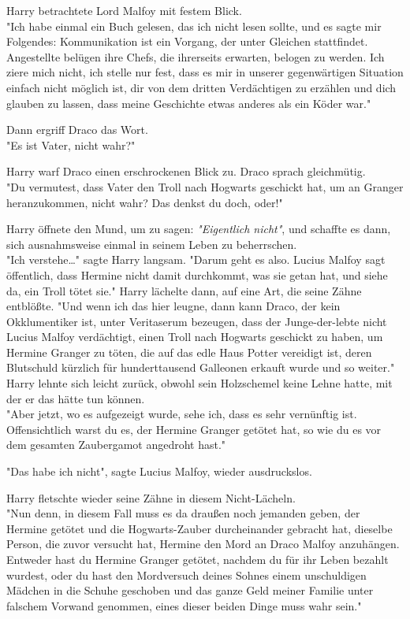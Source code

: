{Harry betrachtete Lord Malfoy mit festem Blick.\\ "Ich habe einmal ein Buch gelesen, das ich nicht lesen sollte, und es sagte mir Folgendes: Kommunikation ist ein Vorgang, der unter Gleichen stattfindet. Angestellte belügen ihre Chefs, die ihrerseits erwarten, belogen zu werden. Ich ziere mich nicht, ich stelle nur fest, dass es mir in unserer gegenwärtigen Situation einfach nicht möglich ist, dir von dem dritten Verdächtigen zu erzählen und dich glauben zu lassen, dass meine Geschichte etwas anderes als ein Köder war."

Dann ergriff Draco das Wort.\\ "Es ist Vater, nicht wahr?"

Harry warf Draco einen erschrockenen Blick zu. Draco sprach gleichmütig.\\ "Du vermutest, dass Vater den Troll nach Hogwarts geschickt hat, um an Granger heranzukommen, nicht wahr? Das denkst du doch, oder!"

Harry öffnete den Mund, um zu sagen: \emph{"Eigentlich nicht"}, und schaffte es dann, sich ausnahmsweise einmal in seinem Leben zu beherrschen.\\ "Ich verstehe…" sagte Harry langsam. "Darum geht es also. Lucius Malfoy sagt öffentlich, dass Hermine nicht damit durchkommt, was sie getan hat, und siehe da, ein Troll tötet sie." Harry lächelte dann, auf eine Art, die seine Zähne entblößte. "Und wenn ich das hier leugne, dann kann Draco, der kein Okklumentiker ist, unter Veritaserum bezeugen, dass der Junge-der-lebte nicht Lucius Malfoy verdächtigt, einen Troll nach Hogwarts geschickt zu haben, um Hermine Granger zu töten, die auf das edle Haus Potter vereidigt ist, deren Blutschuld kürzlich für hunderttausend Galleonen erkauft wurde und so weiter."\\ Harry lehnte sich leicht zurück, obwohl sein Holzschemel keine Lehne hatte, mit der er das hätte tun können.\\ "Aber jetzt, wo es aufgezeigt wurde, sehe ich, dass es sehr vernünftig ist. Offensichtlich warst du es, der Hermine Granger getötet hat, so wie du es vor dem gesamten Zaubergamot angedroht hast."

"Das habe ich nicht", sagte Lucius Malfoy, wieder ausdruckslos.

Harry fletschte wieder seine Zähne in diesem Nicht-Lächeln.\\ "Nun denn, in diesem Fall muss es da draußen noch jemanden geben, der Hermine getötet und die Hogwarts-Zauber durcheinander gebracht hat, dieselbe Person, die zuvor versucht hat, Hermine den Mord an Draco Malfoy anzuhängen. Entweder hast du Hermine Granger getötet, nachdem du für ihr Leben bezahlt wurdest, oder du hast den Mordversuch deines Sohnes einem unschuldigen Mädchen in die Schuhe geschoben und das ganze Geld meiner Familie unter falschem Vorwand genommen, eines dieser beiden Dinge muss wahr sein."

}

